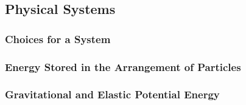 \documentclass[../main-physics-problems.tex]{subfiles}
\begin{document}
\subsection{Physical Systems}

\subsubsection{Choices for a System}
\subsubsection{Energy Stored in the Arrangement of Particles}
\clearpage

\subsubsection{Gravitational and Elastic Potential Energy}
\end{document}
